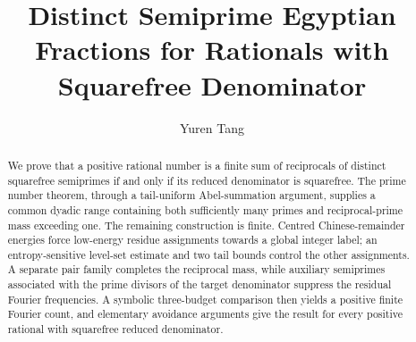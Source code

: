 \documentclass[11pt]{article}
\title{Distinct Semiprime Egyptian Fractions for Rationals with Squarefree Denominator}
\author{Yuren Tang}
\date{}
\theoremstyle{definition}
\begin{document}
\maketitle

\begin{abstract}
We prove that a positive rational number is a finite sum of reciprocals of
 distinct squarefree semiprimes if and only if its reduced denominator is
 squarefree.  The prime number theorem, through a tail-uniform Abel-summation
 argument, supplies a common dyadic range containing both sufficiently many
 primes and reciprocal-prime mass exceeding one.  The remaining construction is
 finite.  Centred Chinese-remainder energies force low-energy residue
 assignments towards a global integer label; an entropy-sensitive level-set
 estimate and two tail bounds control the other assignments.  A separate pair
 family completes the reciprocal mass, while auxiliary semiprimes associated
 with the prime divisors of the target denominator suppress the residual
 Fourier frequencies.  A symbolic three-budget comparison then yields a
 positive finite Fourier count, and elementary avoidance arguments give the
 result for every positive rational with squarefree reduced denominator.
\end{abstract}















\end{document}
